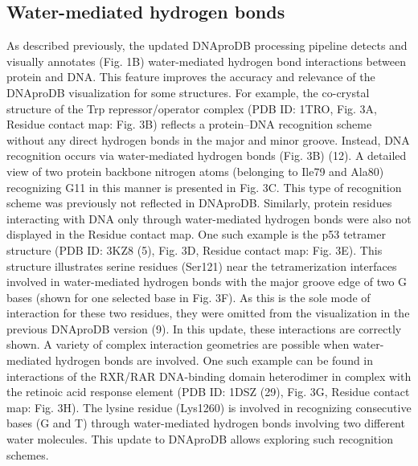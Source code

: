\subsection{Water-mediated hydrogen bonds}
As described previously, the updated DNAproDB processing pipeline detects and visually annotates (Fig. 1B) water-mediated hydrogen bond interactions between protein and DNA. This feature improves the accuracy and relevance of the DNAproDB visualization for some structures. For example, the co-crystal structure of the Trp repressor/operator complex (PDB ID: 1TRO, Fig. 3A, Residue contact map: Fig. 3B) reflects a protein–DNA recognition scheme without any direct hydrogen bonds in the major and minor groove. Instead, DNA recognition occurs via water-mediated hydrogen bonds (Fig. 3B) (12). A detailed view of two protein backbone nitrogen atoms (belonging to Ile79 and Ala80) recognizing G11 in this manner is presented in Fig. 3C. This type of recognition scheme was previously not reflected in DNAproDB. Similarly, protein residues interacting with DNA only through water-mediated hydrogen bonds were also not displayed in the Residue contact map. One such example is the p53 tetramer structure (PDB ID: 3KZ8 (5), Fig. 3D, Residue contact map: Fig. 3E). This structure illustrates serine residues (Ser121) near the tetramerization interfaces involved in water-mediated hydrogen bonds with the major groove edge of two G bases (shown for one selected base in Fig. 3F). As this is the sole mode of interaction for these two residues, they were omitted from the visualization in the previous DNAproDB version (9). In this update, these interactions are correctly shown. A variety of complex interaction geometries are possible when water-mediated hydrogen bonds are involved. One such example can be found in interactions of the RXR/RAR DNA-binding domain heterodimer in complex with the retinoic acid response element (PDB ID: 1DSZ (29), Fig. 3G, Residue contact map: Fig. 3H). The lysine residue (Lys1260) is involved in recognizing consecutive bases (G and T) through water-mediated hydrogen bonds involving two different water molecules. This update to DNAproDB allows exploring such recognition schemes. 

